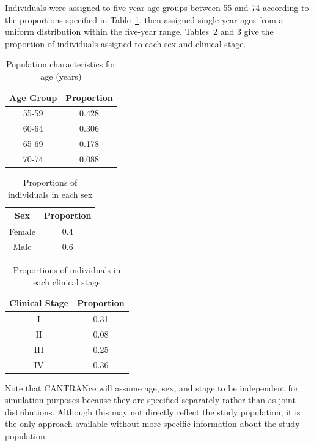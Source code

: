 \documentclass[11pt]{article}
\begin{document}
Individuals were assigned to five-year age groups between 55 and 74 according to the proportions specified in Table~\ref{tab:age}, then assigned single-year ages from a uniform distribution within the five-year range.
Tables~\ref{tab:sex} and \ref{tab:stage} give the proportion of individuals assigned to each sex and clinical stage.


\begin{table}[!ht]
\centering
\begin{tabular}{cc}
  \hline
Age Group & Proportion \\ 
  \hline
55-59 & 0.428 \\ 
  60-64 & 0.306 \\ 
  65-69 & 0.178 \\ 
  70-74 & 0.088 \\ 
   \hline
\end{tabular}
\caption{Population characteristics for age (years)} 
\label{tab:age}
\end{table}
\begin{table}[!ht]
\centering
\begin{tabular}{cc}
  \hline
Sex & Proportion \\ 
  \hline
Female & 0.4 \\ 
  Male & 0.6 \\ 
   \hline
\end{tabular}
\caption{Proportions of individuals in each sex} 
\label{tab:sex}
\end{table}
\begin{table}[!ht]
\centering
\begin{tabular}{cc}
  \hline
Clinical Stage & Proportion \\ 
  \hline
I & 0.31 \\ 
  II & 0.08 \\ 
  III & 0.25 \\ 
  IV & 0.36 \\ 
   \hline
\end{tabular}
\caption{Proportions of individuals in each clinical stage} 
\label{tab:stage}
\end{table}
Note that CANTRANce will assume age, sex, and stage to be independent for simulation purposes because they are specified separately rather than as joint distributions. 
Although this may not directly reflect the study population, it is the only approach available without more specific information about the study population.
\end{document}
